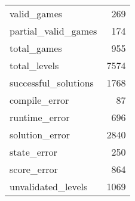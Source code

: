 \begin{tabular}{lr}
\toprule
\midrule
valid_games & 269 \\
partial_valid_games & 174 \\
total_games & 955 \\
total_levels & 7574 \\
successful_solutions & 1768 \\
compile_error & 87 \\
runtime_error & 696 \\
solution_error & 2840 \\
state_error & 250 \\
score_error & 864 \\
unvalidated_levels & 1069 \\
\bottomrule
\end{tabular}
